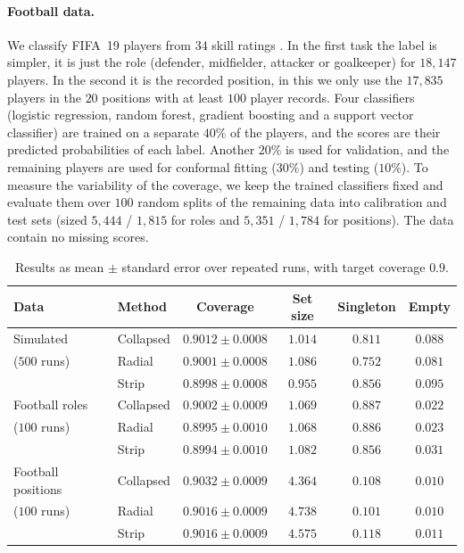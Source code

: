 \paragraph{Football data.} We classify FIFA~19 players from $34$ skill ratings \citep{fifa19data}. In the first task 
the label is simpler, it is just the role (defender, midfielder, attacker or goalkeeper) for $18{,}147$ players. In the 
second it is the recorded position, in this we only use the $17{,}835$ players in the $20$ positions with at least $100$ 
player records. Four classifiers (logistic regression, random forest, gradient boosting and a support vector classifier) 
are trained on a separate $40\%$ of the players, and the scores are their predicted probabilities of each label. Another
$20\%$ is used for validation, and the remaining players are used for conformal fitting ($30\%$) and testing ($10\%$). 
To measure the variability of the coverage, we keep the trained classifiers fixed and evaluate them over $100$ random splits 
of the remaining data into calibration and test sets (sized $5{,}444$ / $1{,}815$ for roles and 
$5{,}351$ / $1{,}784$ for positions). The data contain no missing scores.

 
\begin{table}[ht]
\centering
\small
\begin{tabular}{llcccc}
\toprule
Data & Method & Coverage & Set size & Singleton & Empty \\
\midrule
Simulated & Collapsed & $0.9012\pm0.0008$ & $1.014$ & $0.811$ & $0.088$ \\
($500$ runs) & Radial & $0.9001\pm0.0008$ & $1.086$ & $0.752$ & $0.081$ \\
 & Strip & $0.8998\pm0.0008$ & $0.955$ & $0.856$ & $0.095$ \\
\midrule
Football roles & Collapsed & $0.9002\pm0.0009$ & $1.069$ & $0.887$ & $0.022$ \\
($100$ runs) & Radial & $0.8995\pm0.0010$ & $1.068$ & $0.886$ & $0.023$ \\
 & Strip & $0.8994\pm0.0010$ & $1.082$ & $0.856$ & $0.031$ \\
\midrule
Football positions & Collapsed & $0.9032\pm0.0009$ & $4.364$ & $0.108$ & $0.010$ \\
($100$ runs) & Radial & $0.9016\pm0.0009$ & $4.738$ & $0.101$ & $0.010$ \\
 & Strip & $0.9016\pm0.0009$ & $4.575$ & $0.118$ & $0.011$ \\
\bottomrule
\end{tabular}
\caption{Results as mean $\pm$ standard error over repeated runs, with target coverage $0.9$.}
\label{tab:results}
\end{table}

